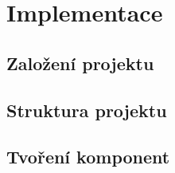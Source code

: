 
\chapter{Implementace}

\section{Založení projektu}

\section{Struktura projektu}

\section{Tvoření komponent}
